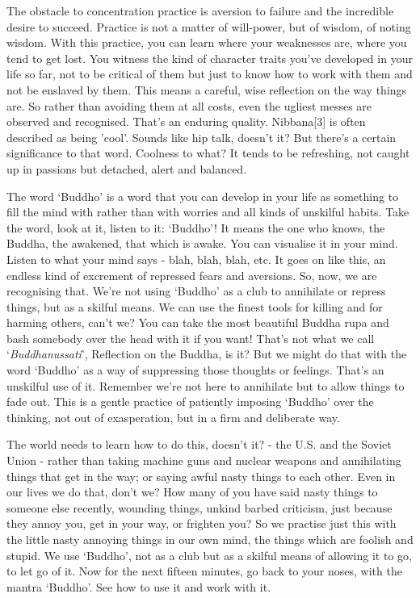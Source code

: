 The obstacle to concentration practice is aversion to failure and the incredible desire to succeed. Practice is not a matter of will-power, but of wisdom, of noting wisdom. With this practice, you can learn where your weaknesses are, where you tend to get lost. You witness the kind of character traits you've developed in your life so far, not to be critical of them but just to know how to work with them and not be enslaved by them. This means a careful, wise reflection on the way things are. So rather than avoiding them at all costs, even the ugliest messes are observed and recognised. That's an enduring quality. Nibbana[3] is often described as being 'cool'. Sounds like hip talk, doesn't it? But there's a certain significance to that word. Coolness to what? It tends to be refreshing, not caught up in passions but detached, alert and balanced.

The word `Buddho' is a word that you can develop in your life as something to fill the mind with rather than with worries and all kinds of unskilful habits. Take the word, look at it, listen to it: `Buddho'! It means the one who knows, the Buddha, the awakened, that which is awake. You can visualise it in your mind. Listen to what your mind says - blah, blah, blah, etc. It goes on like this, an endless kind of excrement of repressed fears and aversions. So, now, we are recognising that. We're not using `Buddho' as a club to annihilate or repress things, but as a skilful means. We can use the finest tools for killing and for harming others, can't we? You can take the most beautiful Buddha rupa and bash somebody over the head with it if you want! That's not what we call `\textit{Buddhanussati}', Reflection on the Buddha, is it? But we might do that with the word `Buddho' as a way of suppressing those thoughts or feelings. That's an unskilful use of it. Remember we're not here to annihilate but to allow things to fade out. This is a gentle practice of patiently imposing `Buddho' over the thinking, not out of exasperation, but in a firm and deliberate way.

The world needs to learn how to do this, doesn't it? - the U.S. and the Soviet Union - rather than taking machine guns and nuclear weapons and annihilating things that get in the way; or saying awful nasty things to each other. Even in our lives we do that, don't we? How many of you have said nasty things to someone else recently, wounding things, unkind barbed criticism, just because they annoy you, get in your way, or frighten you? So we practise just this with the little nasty annoying things in our own mind, the things which are foolish and stupid. We use `Buddho', not as a club but as a skilful means of allowing it to go, to let go of it. Now for the next fifteen minutes, go back to your noses, with the mantra `Buddho'. See how to use it and work with it.

